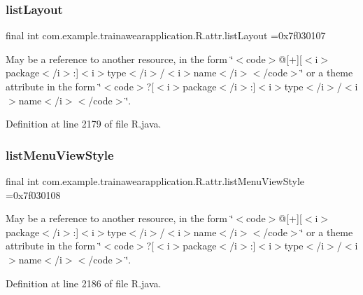 \subsubsection{\texorpdfstring{listLayout}{listLayout}}
{\footnotesize\ttfamily final int com.\+example.\+trainawearapplication.\+R.\+attr.\+list\+Layout =0x7f030107\hspace{0.3cm}{\ttfamily [static]}}

May be a reference to another resource, in the form \char`\"{}$<$code$>$@\mbox{[}+\mbox{]}\mbox{[}$<$i$>$package$<$/i$>$\+:\mbox{]}$<$i$>$type$<$/i$>$/$<$i$>$name$<$/i$>$$<$/code$>$\char`\"{} or a theme attribute in the form \char`\"{}$<$code$>$?\mbox{[}$<$i$>$package$<$/i$>$\+:\mbox{]}$<$i$>$type$<$/i$>$/$<$i$>$name$<$/i$>$$<$/code$>$\char`\"{}. 

Definition at line 2179 of file R.\+java.

\mbox{\label{classcom_1_1example_1_1trainawearapplication_1_1_r_1_1attr_a715fc79a00526bee101e986858320b68}} 
\subsubsection{\texorpdfstring{listMenuViewStyle}{listMenuViewStyle}}
{\footnotesize\ttfamily final int com.\+example.\+trainawearapplication.\+R.\+attr.\+list\+Menu\+View\+Style =0x7f030108\hspace{0.3cm}{\ttfamily [static]}}

May be a reference to another resource, in the form \char`\"{}$<$code$>$@\mbox{[}+\mbox{]}\mbox{[}$<$i$>$package$<$/i$>$\+:\mbox{]}$<$i$>$type$<$/i$>$/$<$i$>$name$<$/i$>$$<$/code$>$\char`\"{} or a theme attribute in the form \char`\"{}$<$code$>$?\mbox{[}$<$i$>$package$<$/i$>$\+:\mbox{]}$<$i$>$type$<$/i$>$/$<$i$>$name$<$/i$>$$<$/code$>$\char`\"{}. 

Definition at line 2186 of file R.\+java.

\mbox{\label{classcom_1_1example_1_1trainawearapplication_1_1_r_1_1attr_ab3e9100201566b9005ed977a07d783ed}} 
